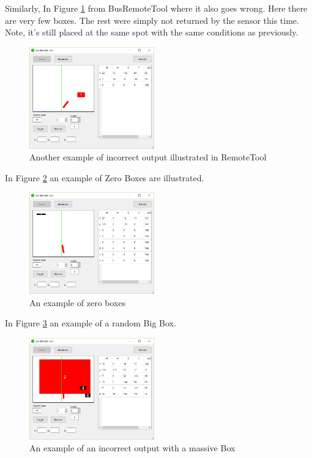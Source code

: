Similarly, In Figure \ref{fig:RemoteToolOutput3} from BusRemoteTool where it also goes wrong. Here there are very few boxes. The rest were simply not returned by the sensor this time. Note, it's still placed at the same spot with the same conditions as previously.
\begin{figure}[H]
    \centering
    \includegraphics[width=0.48\textwidth]{Images/Analysis/NXTCamTesting/BusRemoteTool_Few.png}
    \caption{Another example of incorrect output illustrated in RemoteTool}
    \label{fig:RemoteToolOutput3}
\end{figure}



In Figure \ref{fig:RemoteToolOutputZero} an example of Zero Boxes are illustrated.
\begin{figure}[H]
    \centering
    \includegraphics[width=0.48\textwidth]{Images/Analysis/NXTCamTesting/BusRemoteTool_ZeroBoxes3.png}
    \caption{An example of zero boxes}
    \label{fig:RemoteToolOutputZero}
\end{figure}



In Figure \ref{fig:RemoteToolMassive} an example of a random Big Box.
\begin{figure}[H]
    \centering
    \includegraphics[width=0.48\textwidth]{Images/Analysis/NXTCamTesting/BusRemoteTool_BigBox.png}
    \caption{An example of an incorrect output with a massive Box}
    \label{fig:RemoteToolMassive}
\end{figure}

